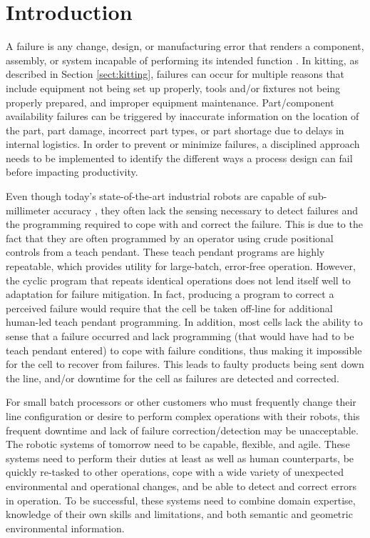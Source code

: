 \section{Introduction}
A failure is any change, design, or manufacturing error that renders a component, assembly, or system incapable of performing its intended function \cite{Collins93}. In kitting, as described in Section \ref{sect:kitting}, failures can occur for multiple reasons that include equipment not being set up properly, tools and/or fixtures not being properly prepared, and improper equipment maintenance. Part/component availability failures can be triggered by inaccurate information on the location of the part, part damage, incorrect part types, or part shortage due to delays in internal logistics. In order to prevent or minimize failures, a disciplined approach needs to be implemented to identify the different ways a process design can fail before impacting productivity.

Even though today's state-of-the-art industrial robots are capable of sub-millimeter accuracy \cite{RobotAccuracy}, they often lack the sensing
necessary to detect failures and the programming required to cope with and correct the failure. This is due to the fact that they are often programmed
by an operator using crude positional controls from a teach pendant. These teach pendant programs are highly repeatable, which provides 
utility for large-batch, error-free operation. However, the cyclic program that repeats identical operations does not lend itself well to adaptation for 
failure mitigation. In fact, producing a program to correct a perceived failure would require that the cell be taken off-line
for additional human-led teach pendant programming. In addition, 
most cells lack the ability to sense that a failure occurred and  lack programming (that would have had to be teach pendant entered) to cope
with failure conditions, thus making it impossible for the cell to recover from failures.
This leads to faulty products being sent down the line, and/or downtime for the cell as failures are detected and corrected.

For small batch processors or other customers who must frequently change their line configuration or desire to perform complex operations
with their robots, this frequent downtime and lack of failure correction/detection may be unacceptable. The robotic systems of tomorrow need to be capable, flexible, and agile.  
These systems need to perform their duties at least  as well as human counterparts, be quickly re-tasked to other operations, cope with a wide 
variety of unexpected environmental and operational changes, and be able to detect and correct errors in operation. 
To be successful, these systems need to combine domain expertise, knowledge of their own skills and limitations, and both semantic and geometric 
environmental information.

